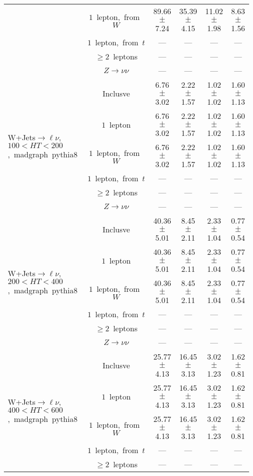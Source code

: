 \documentclass{article}
\begin{document}
\begin{longtable}{|l|c|c|c|c|c|}
 & $1$~lepton,~from~$W$  & 89.66 $\pm$ 7.24  & 35.39 $\pm$ 4.15  & 11.02 $\pm$ 1.98  & 8.63 $\pm$ 1.56 \\* 
 & $1$~lepton,~from~$t$  & ---  & ---  & ---  & --- \\* 
 & $\ge2$~leptons  & ---  & ---  & ---  & --- \\* 
 & $Z\rightarrow\nu\nu$  & ---  & ---  & ---  & --- \\* 
\hline 
\multirow{6}{*}{W+Jets$\rightarrow\ell\nu$,~$100<HT<200$,~madgraph~pythia8} & Inclusve  & 6.76 $\pm$ 3.02  & 2.22 $\pm$ 1.57  & 1.02 $\pm$ 1.02  & 1.60 $\pm$ 1.13 \\* 
 & $1$~lepton  & 6.76 $\pm$ 3.02  & 2.22 $\pm$ 1.57  & 1.02 $\pm$ 1.02  & 1.60 $\pm$ 1.13 \\* 
 & $1$~lepton,~from~$W$  & 6.76 $\pm$ 3.02  & 2.22 $\pm$ 1.57  & 1.02 $\pm$ 1.02  & 1.60 $\pm$ 1.13 \\* 
 & $1$~lepton,~from~$t$  & ---  & ---  & ---  & --- \\* 
 & $\ge2$~leptons  & ---  & ---  & ---  & --- \\* 
 & $Z\rightarrow\nu\nu$  & ---  & ---  & ---  & --- \\* 
\hline 
\multirow{6}{*}{W+Jets$\rightarrow\ell\nu$,~$200<HT<400$,~madgraph~pythia8} & Inclusve  & 40.36 $\pm$ 5.01  & 8.45 $\pm$ 2.11  & 2.33 $\pm$ 1.04  & 0.77 $\pm$ 0.54 \\* 
 & $1$~lepton  & 40.36 $\pm$ 5.01  & 8.45 $\pm$ 2.11  & 2.33 $\pm$ 1.04  & 0.77 $\pm$ 0.54 \\* 
 & $1$~lepton,~from~$W$  & 40.36 $\pm$ 5.01  & 8.45 $\pm$ 2.11  & 2.33 $\pm$ 1.04  & 0.77 $\pm$ 0.54 \\* 
 & $1$~lepton,~from~$t$  & ---  & ---  & ---  & --- \\* 
 & $\ge2$~leptons  & ---  & ---  & ---  & --- \\* 
 & $Z\rightarrow\nu\nu$  & ---  & ---  & ---  & --- \\* 
\hline 
\multirow{6}{*}{W+Jets$\rightarrow\ell\nu$,~$400<HT<600$,~madgraph~pythia8} & Inclusve  & 25.77 $\pm$ 4.13  & 16.45 $\pm$ 3.13  & 3.02 $\pm$ 1.23  & 1.62 $\pm$ 0.81 \\* 
 & $1$~lepton  & 25.77 $\pm$ 4.13  & 16.45 $\pm$ 3.13  & 3.02 $\pm$ 1.23  & 1.62 $\pm$ 0.81 \\* 
 & $1$~lepton,~from~$W$  & 25.77 $\pm$ 4.13  & 16.45 $\pm$ 3.13  & 3.02 $\pm$ 1.23  & 1.62 $\pm$ 0.81 \\* 
 & $1$~lepton,~from~$t$  & ---  & ---  & ---  & --- \\* 
 & $\ge2$~leptons  & ---  & ---  & ---  & --- \\* 

\end{longtable}
\end{document}
